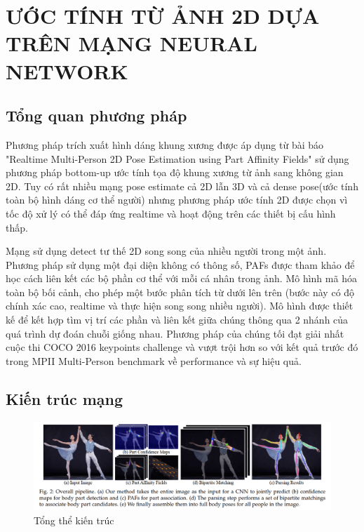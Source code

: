 \section{ƯỚC TÍNH TỪ ẢNH 2D DỰA TRÊN MẠNG NEURAL NETWORK}
\label{ss:2Dpose}
\subsection{Tổng quan phương pháp}
\label{sss:tong_quan_2D_pose}
Phương pháp trích xuất hình dáng khung xương được áp dụng từ bài báo "Realtime Multi-Person 2D Pose Estimation using Part Affinity Fields" \cite{cao2017realtime} sử dụng phương pháp bottom-up ước tính tọa độ khung xương từ ảnh sang không gian 2D. Tuy có rất nhiều mạng pose estimate cả 2D lẫn 3D và cả dense pose(ước tính toàn bộ hình dáng cơ thể người) nhưng phương pháp ước tính 2D được chọn vì tốc độ xử lý có thể đáp ứng realtime và hoạt động trên các thiết bị cấu hình thấp.

Mạng sử dụng  detect tư thế 2D song song của nhiều người trong một ảnh. Phương pháp sử dụng một đại diện không có thông số, PAFs được tham khảo để học cách liên kết các bộ phần cơ thể với mỗi cá nhân trong ảnh. Mô hình mã hóa toàn bộ bối cảnh, cho phép một bước phân tích từ dưới lên trên (bước này có độ chính xác cao, realtime và thực hiện song song nhiều người). Mô hình được thiết kế để kết hợp tìm vị trí các phần và liên kết giữa chúng thông qua 2 nhánh của quá trình dự đoán chuỗi giống nhau. Phương pháp của chúng tối đạt giải nhất cuộc thi COCO 2016 keypoints challenge và vượt trội hơn so với kết quả trước đó trong MPII Multi-Person benchmark về performance và sự hiệu quả.

\subsection{Kiến trúc mạng}
\label{sss:method}

\FloatBarrier
\begin{figure}[htp]
\begin{center}
\includegraphics[scale=0.3]{chap3/c3_figs/pipeline.png}
\end{center}
\caption{Tổng thể kiến trúc}
\label{fig:pipelineS}
\end{figure}
\FloatBarrier

